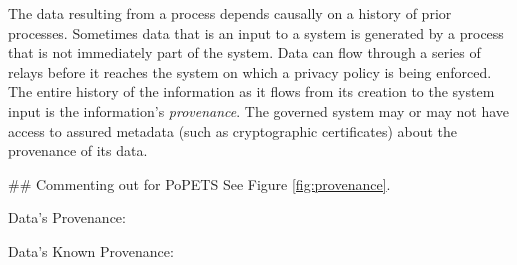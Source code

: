 \documentclass[../thesis.tex]{subfiles}
\begin{document}
The data resulting from a process depends causally
on a history of prior processes.
Sometimes data that is an input to a system
is generated by a process that is not immediately part
of the system.
Data can flow through 
a series of relays before it reaches
the system on which a privacy policy is being enforced.
The entire history of the information as it flows from its 
creation to the system input is the information's 
\emph{provenance}.
The governed system may or may not have access to
assured metadata (such as cryptographic certificates)
about the provenance of its data.

\iffalse
## Commenting out for PoPETS
See Figure \ref{fig:provenance}.

\begin{figure*}
\noindent
Data's Provenance:
\begin{center}
\footnotesize
{}
\end{center}
\noindent
Data's Known Provenance:
\begin{center}
\footnotesize
{}
\end{center}
\end{figure*}
\end{document}
